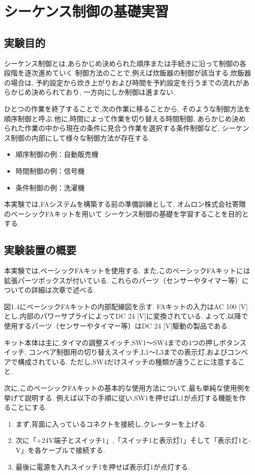 
\section{シーケンス制御の基礎実習}

\subsection{実験目的}
シーケンス制御とは,あらかじめ決められた順序または手続きに沿って制御の各段階を逐次進めていく
制御方法のことで,例えば炊飯器の制御が該当する.炊飯器の場合は,
予約設定から炊き上がりおよび時間を予約設定を行うまでの流れがあらかじめ決められており,
一方向にしか制御は進まない.

ひとつの作業を終了することで,次の作業に移ることから,
そのような制御方法を順序制御と呼ぶ.他に,時間によって作業を切り替える時間制御,
あらかじめ決められた作業の中から現在の条件に見合う作業を選択する条件制御など,
シーケンス制御の内部にして様々な制御方法が存在する.

\begin{itemize}
  \item 順序制御の例：自動販売機
  \item 時間制御の例：信号機
  \item 条件制御の例：洗濯機
\end{itemize}

本実験では,FAシステムを構築する前の準備訓練として,
オムロン株式会社寄贈のベーシックFAキットを用いて
シーケンス制御の基礎を学習することを目的とする.

\subsection{実験装置の概要}

本実験では,ベーシックFAキットを使用する.
また,このベーシックFAキットには拡張パーツボックスが付いている.
これらのパーツ（センサーやタイマー等）についての詳細は次章で述べる.

図1.4にベーシックFAキットの内部配線図を示す.
FAキットの入力はAC 100 [V]とし,内部のパワーサプライによってDC 24 [V]に変換されている.
よって,以降で使用するパーツ（センサーやタイマー等）はDC 24 [V]駆動の製品である.

キット本体は主に,タイマの調整スイッチ,SW1〜SW4までの4つの押しボタンスイッチ,
コンベア制御用の切り替えスイッチ,L1〜L3までの表示灯,およびコンベアで構成されている.
ただし,SW4だけスイッチの種類が違うことに注意すること.

次に,このベーシックFAキットの基本的な使用方法について,最も単純な使用例を挙げて説明する.
例えば以下の手順に従い,SW1を押せばL1が点灯する機能を作ることにする.
\begin{enumerate}
  \item まず,背面に入っているコネクトを接続し,クレーターを上げる.
  \item 次に「+24V端子とスイッチ1」,「スイッチ1と表示灯1」そして「表示灯1と-V」を各ケーブルで接続する.
  \item 最後に電源を入れスイッチ1を押せば表示灯1が点灯する.
\end{enumerate}

